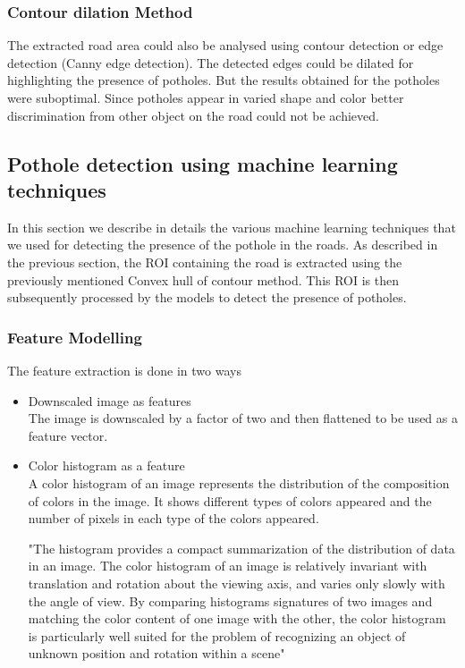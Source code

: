 \documentclass[journal]{IEEEtran}
\begin{document}
\vspace*{.5cm}

\subsubsection*{Contour dilation Method}
The extracted road area could also be analysed using contour detection or edge detection (Canny edge detection). The detected edges could be dilated for highlighting the presence of potholes. But the results obtained for the potholes were sub\-optimal. Since potholes appear in varied shape and color better discrimination from other object on the road could not be achieved. 

\subsection{Pothole detection using machine learning techniques}

In this section we describe in details the various machine learning techniques that we used for detecting the presence of the pothole in the roads. As described in the previous section, the ROI containing the road is extracted using the previously mentioned Convex hull of contour method. This ROI is then subsequently processed by the models to detect the presence of potholes.

\subsubsection{Feature Modelling}

The feature extraction is done in two ways 
\begin{itemize}
\item Downscaled image as features \\
The image is downscaled by a factor of two and then flattened to be used as a feature vector.
\item Color histogram as a feature \\
A color histogram of an image represents the distribution of the composition of colors in the image. It shows different types of colors appeared and the number of pixels in each type of the colors appeared.

\vspace*{0.5cm}

"The histogram provides a compact summarization of the distribution of data in an image. The color histogram of an image is relatively invariant with translation and rotation about the viewing axis, and varies only slowly with the angle of view. By comparing histograms signatures of two images and matching the color content of one image with the other, the color histogram is particularly well suited for the problem of recognizing an object of unknown position and rotation within a scene" \cite{hist}
\end{itemize}
\end{document}
